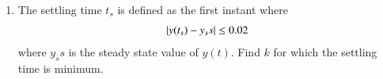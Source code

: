 \begin{enumerate}[label=\thesubsection.\arabic*.,ref=\thesubsection.\theenumi]
\item  The settling time $t_s$ is defined as the first instant where
%
\begin{align}
\left\vert y(t_s)-y_ss\right\vert \le 0.02
\end{align}
where $y_ss$ is the steady state value of $y(t)$.  Find $k$ for which the settling time is minimum.
%

\end{enumerate}
